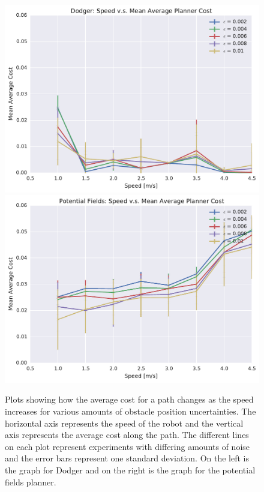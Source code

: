 \begin{figure}[h!]
    \centering

    \includegraphics[width=0.48\linewidth]{figs/planner_mean_avg_cost_2}
    \includegraphics[width=0.48\linewidth]{figs/pf_mean_avg_cost_2}

    \caption{Plots showing how the average cost for a path changes as the
        speed increases for various amounts of obstacle position uncertainties.
        The horizontal axis represents the speed of the robot and the vertical
        axis represents the average cost along the path. The different lines on
    each plot represent experiments with differing amounts of noise and the
error bars represent one standard deviation.  On the left is the graph for
Dodger and on the right is the graph for the potential fields planner.}

\end{figure}

